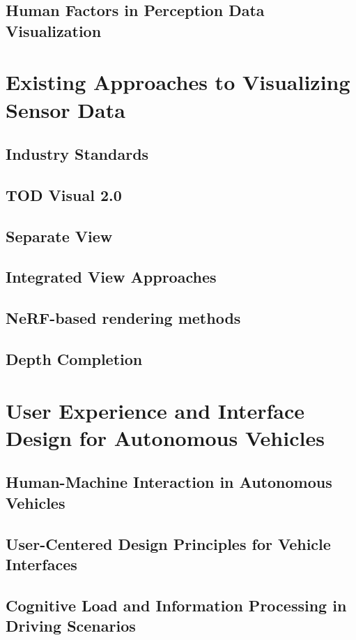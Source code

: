 \subsection{Human Factors in Perception Data Visualization}

\section{Existing Approaches to Visualizing Sensor Data}
\subsection{Industry Standards}
\subsection{TOD Visual 2.0}
\subsection{Separate View}\label{section:separateview}
\subsection{Integrated View Approaches}\label{section:integratedview}
\subsection{NeRF-based rendering methods}
\subsection{Depth Completion}

\section{User Experience and Interface Design for Autonomous Vehicles}
\subsection{Human-Machine Interaction in Autonomous Vehicles}
\subsection{User-Centered Design Principles for Vehicle Interfaces}
\subsection{Cognitive Load and Information Processing in Driving Scenarios}
